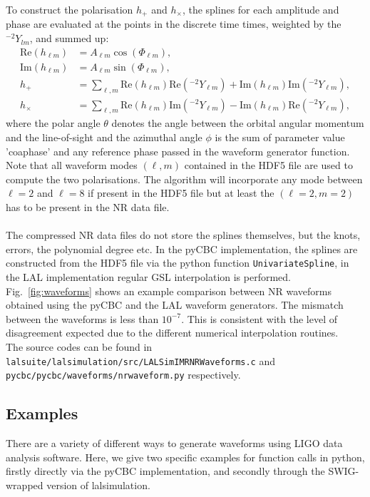 \documentclass[aps,prd,amssymb,amsmath,amsfonts,superscriptaddress,
floatfix ,preprintnumbers,altaffilletter]{revtex4}
\begin{document}
To construct the polarisation $h_+$ and $h_\times$, the splines for each amplitude and phase are evaluated at the points in the discrete time times, 
weighted by the ${}^{-2}Y_{lm}$, and summed up:
\begin{align}
\label{}
    \mathrm{Re}(h_{\ell m}) &= A_{\ell m} \cos(\Phi_{\ell m}),   \\
    \mathrm{Im}(h_{\ell m}) &= A_{\ell m} \sin(\Phi_{\ell m}),   \\
    h_+ &= \sum_{\ell, m} \mathrm{Re}(h_{\ell m}) \mathrm{Re}({}^{-2}Y_{\ell m}) + \mathrm{Im}(h_{\ell m}) \mathrm{Im}({}^{-2}Y_{\ell m}), \\
    h_\times &= \sum_{\ell, m} \mathrm{Re}(h_{\ell m}) \mathrm{Im}({}^{-2}Y_{\ell m}) - \mathrm{Im}(h_{\ell m}) \mathrm{Re}({}^{-2}Y_{\ell m}),
\end{align}
where the polar angle $\theta$ denotes the angle between the orbital angular momentum and the line-of-sight and the azimuthal
angle $\phi$ is the sum of parameter value 'coa\textunderscore phase' and any reference phase passed in the waveform generator function.
\\
Note that all waveform modes $(\ell, m)$ contained in the HDF5 file are used
to compute the two polarisations. The algorithm will incorporate any mode between $\ell =2$ and $\ell =8$ if present in the
HDF5 file but at least the $(\ell=2, m=2)$ has to be present in the NR data file. \\
\\
The compressed NR data files do not store the splines themselves, but the knots, errors, the polynomial degree etc. In the pyCBC implementation,
the splines are constructed from the HDF5 file via the python function \texttt{UnivariateSpline}, in the LAL implementation regular GSL interpolation
is performed. Fig.~\ref{fig:waveforms} shows an example comparison between NR waveforms obtained using the pyCBC and the LAL waveform generators. The mismatch
between the waveforms is less than $10^{-7}$. This is consistent with the level of disagreement expected due to the different numerical interpolation
routines. \\
The source codes can be found in \texttt{lalsuite/lalsimulation/src/LALSimIMRNRWaveforms.c} and 
\texttt{pycbc/pycbc/waveforms/nr\textunderscore waveform.py} respectively.

\subsection{Examples}
There are a variety of different ways to generate waveforms using LIGO data analysis software. Here, we give two specific examples
for function calls in python, firstly directly via the pyCBC implementation, and secondly through the SWIG-wrapped version of 
lalsimulation. 
\end{document}
